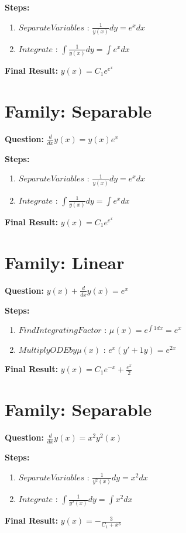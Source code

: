 \documentclass{article}
\begin{document}
\textbf{Steps:}
\begin{enumerate}
\item $Separate Variables$ :  $\frac{1}{y{\left(x \right)}} dy = e^{x} dx$
\item $Integrate$ :  $\int \frac{1}{y{\left(x \right)}} dy = \int e^{x} dx$
\end{enumerate}
\textbf{Final Result:} $y{\left(x \right)} = C_{1} e^{e^{x}}$

\section*{Family: Separable}
\textbf{Question:} $\frac{d}{d x} y{\left(x \right)} = y{\left(x \right)} e^{x}$

\textbf{Steps:}
\begin{enumerate}
\item $Separate Variables$ :  $\frac{1}{y{\left(x \right)}} dy = e^{x} dx$
\item $Integrate$ :  $\int \frac{1}{y{\left(x \right)}} dy = \int e^{x} dx$
\end{enumerate}
\textbf{Final Result:} $y{\left(x \right)} = C_{1} e^{e^{x}}$

\section*{Family: Linear}
\textbf{Question:} $y{\left(x \right)} + \frac{d}{d x} y{\left(x \right)} = e^{x}$

\textbf{Steps:}
\begin{enumerate}
\item $Find Integrating Factor$ :  $\mu(x) = e^{\int 1 dx} = e^{x}$
\item $Multiply ODE by \mu(x)$ :  $e^{x}(y' + 1y) = e^{2 x}$
\end{enumerate}
\textbf{Final Result:} $y{\left(x \right)} = C_{1} e^{- x} + \frac{e^{x}}{2}$

\section*{Family: Separable}
\textbf{Question:} $\frac{d}{d x} y{\left(x \right)} = x^{2} y^{2}{\left(x \right)}$

\textbf{Steps:}
\begin{enumerate}
\item $Separate Variables$ :  $\frac{1}{y^{2}{\left(x \right)}} dy = x^{2} dx$
\item $Integrate$ :  $\int \frac{1}{y^{2}{\left(x \right)}} dy = \int x^{2} dx$
\end{enumerate}
\textbf{Final Result:} $y{\left(x \right)} = - \frac{3}{C_{1} + x^{3}}$
\end{document}
